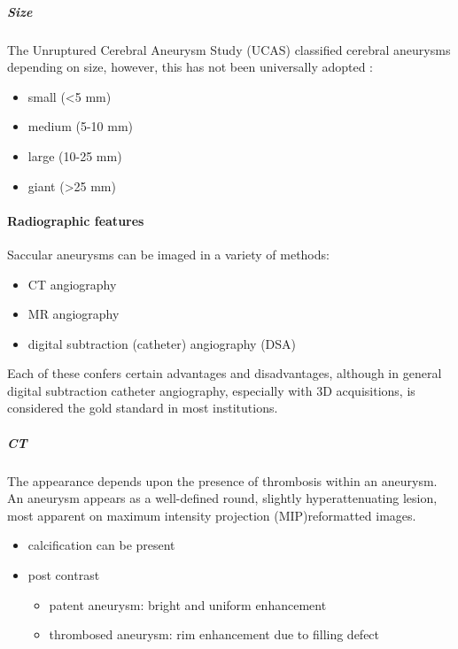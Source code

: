\subparagraph{Size}

The Unruptured Cerebral Aneurysm Study (UCAS) classified cerebral aneurysms depending on size, however, this has not been universally adopted :

\begin{itemize}
	\item
	small (\textless5 mm)
	\item
	medium (5-10 mm)
	\item
	large (10-25 mm)
	\item
	giant (\textgreater25 mm)
\end{itemize}

\paragraph{Radiographic features}

Saccular aneurysms can be imaged in a variety of methods:

\begin{itemize}
	\item
	CT angiography
	\item
	MR angiography
	\item
	digital subtraction (catheter) angiography (DSA)
\end{itemize}

Each of these confers certain advantages and disadvantages, although in general digital subtraction catheter angiography, especially with 3D acquisitions, is considered the gold standard in most institutions.

\subparagraph{CT}

The appearance depends upon the presence of thrombosis within an aneurysm. An aneurysm appears as a well-defined round, slightly hyperattenuating lesion, most apparent on maximum intensity projection (MIP)reformatted images.

\begin{itemize}
	\item
	calcification can be present
	\item
	post contrast
	
	\begin{itemize}
		\item
		patent aneurysm: bright and uniform enhancement
		\item
		thrombosed aneurysm: rim enhancement due to filling defect
	\end{itemize}
\end{itemize}

